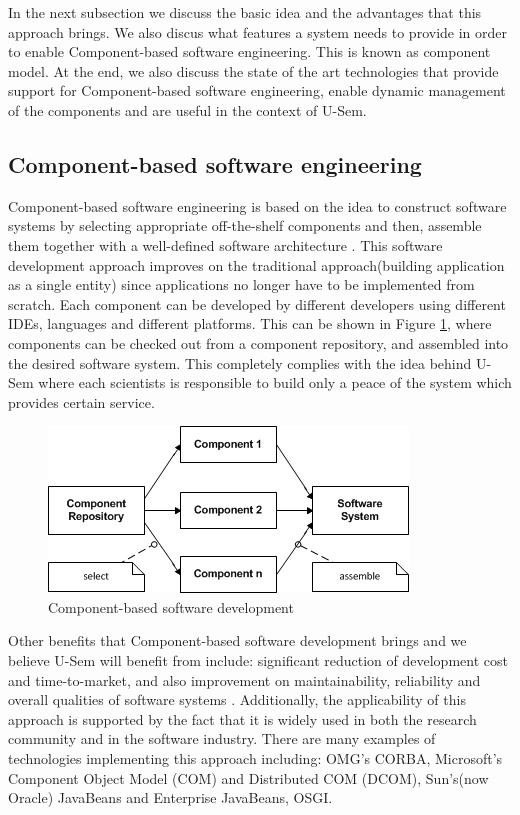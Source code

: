 In the next subsection we discuss the basic idea and the advantages that this approach brings. We also discus what features a system needs to provide in order to enable Component-based software engineering. This is known as component model. At the end, we also discuss the state of the art technologies that provide support for Component-based software engineering, enable dynamic management of the components and are useful in the context of U-Sem. 

\subsection{Component-based software engineering}

Component-based software engineering is based on the idea to construct software systems by selecting appropriate off-the-shelf components and then, assemble them together with a well-defined software architecture \cite{Pour}. This software development approach improves on the traditional approach(building application as a single entity) since applications no longer have to be implemented from scratch. Each component can be developed by different developers using different IDEs, languages and different platforms. This can be shown in Figure \ref{fig_cbsd}, where components can be checked out from a component repository, and assembled into the desired software system. This completely complies with the idea behind U-Sem where each scientists is responsible to build only a peace of the system which provides certain service.

\begin{figure}[h!]
  \centering
  	\includegraphics[scale=0.75]{plug-in/component-based.png}
  \caption{Component-based software development \cite{Pour} }
  \label{fig_cbsd}
\end{figure}

Other benefits that Component-based software development brings and we believe U-Sem will benefit from include: significant reduction of development cost and time-to-market, and also improvement on maintainability, reliability and overall qualities of software systems \cite{Pour1} \cite{Pour2}. Additionally, the applicability of this approach is supported by the fact that it is widely used in both the research community and in the software industry. There are many examples of technologies implementing this approach including: OMG's CORBA,  Microsoft's Component Object Model (COM) and Distributed COM (DCOM), Sun's(now Oracle) JavaBeans and Enterprise JavaBeans, OSGI.

